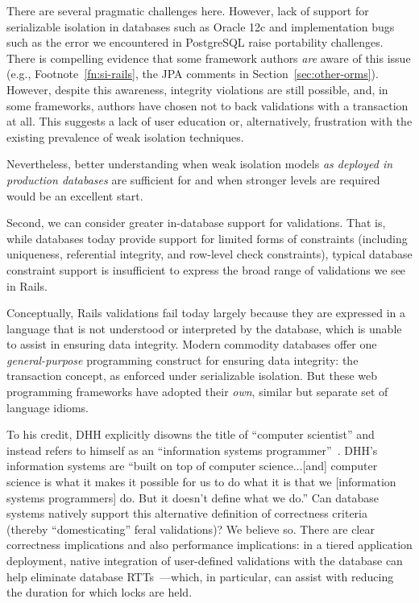 There are several pragmatic challenges here. However, lack of support
for serializable isolation in databases such as Oracle 12c and
implementation bugs such as the error we encountered in PostgreSQL
raise portability challenges. There is compelling evidence that some
framework authors \textit{are} aware of this issue (e.g.,
Footnote~\ref{fn:si-rails}, the JPA comments in
Section~\ref{sec:other-orms}). However, despite this awareness,
integrity violations are still possible, and, in some frameworks,
authors have chosen not to back validations with a transaction at
all. This suggests a lack of user education or, alternatively,
frustration with the existing prevalence of weak isolation techniques.

Nevertheless, better understanding when weak isolation models
\textit{as deployed in production databases} are sufficient for and
when stronger levels are required would be an excellent start.

 Second, we can consider
greater in-database support for validations. That is, while databases
today provide support for limited forms of constraints (including
uniqueness, referential integrity, and row-level check constraints),
typical database constraint support is insufficient to express the
broad range of validations we see in Rails.

Conceptually, Rails validations fail today largely because they are
expressed in a language that is not understood or interpreted by the
database, which is unable to assist in ensuring data integrity. Modern
commodity databases offer one \textit{general-purpose} programming
construct for ensuring data integrity: the transaction concept, as
enforced under serializable isolation. But these web programming
frameworks have adopted their \textit{own}, similar but separate set
of language idioms.

To his credit, DHH explicitly disowns the title of ``computer
scientist'' and instead refers to himself as an ``information systems
programmer''~\cite{dhh-keynote}. DHH's information systems are ``built
on top of computer science...[and] computer science is what it makes
it possible for us to do what it is that we [information systems
programmers] do. But it doesn't define what we do.'' Can database
systems natively support this alternative definition of correctness
criteria (thereby ``domesticating'' feral validations)? We believe
so. There are clear correctness implications and also performance
implications: in a tiered application deployment, native integration
of user-defined validations with the database can help eliminate
database RTTs~\cite{pyxis}---which, in particular, can assist with
reducing the duration for which locks are held.

